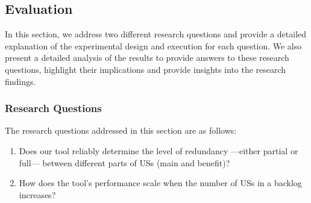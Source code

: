 \subsection{Evaluation}\label{conflict_evaluation}
In this section, we address two different research questions and provide a detailed explanation of the experimental design and execution for each question. We also present a detailed analysis of the results to provide answers to these research questions, highlight their implications and provide insights into the research findings.
\subsubsection*{Research Questions}
The research questions addressed in this section are as follows:
\begin{enumerate}
	\item Does our tool reliably determine the level of redundancy —either partial or full— between different parts of USs (main and benefit)?
	\item How does the tool's performance scale when the number of USs in a backlog increases?
	\end{enumerate}
